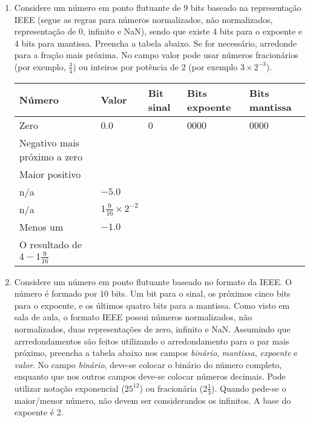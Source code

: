 \begin{enumerate}[resume]
    \item
    Considere um número em ponto flutuante de 9 bits 
    baseado na representação IEEE (segue as regras para números normalizados,
    não normalizados, representação de 0, infinito e NaN), sendo que 
    existe 4 bits para o expoente e 4 bits para mantissa.
    Preencha a tabela abaixo.
    Se for necessário, arredonde para a fração mais próxima.
    No campo valor pode usar números fracionários (por exemplo, $\frac{3}{4}$)
    ou inteiros por potência de 2 (por exemplo $3\times2^{-3}$).

    \begin{table}[H]
        \begin{tabular}{|l|l|l|l|l|}
            \hline
            \textbf{Número}  & 
            \textbf{Valor}    & 
            \textbf{Bit sinal}   &
            \textbf{Bits expoente}   &
            \textbf{Bits mantissa} \\\hline
            Zero & 0.0 & 0 & 0000 & 0000 \\\hline
            Negativo mais próximo a zero & & & & \\\hline
            Maior positivo & & & & \\\hline
            n/a & $-5.0$ & & & \\\hline
            n/a & $1\frac{9}{16}\times2^{-2}$ & & & \\\hline
            Menos um & $-1.0$ & & & \\\hline
            O resultado de $4-1\frac{9}{16}$ & & & & \\
            \hline
        \end{tabular}
    \end{table}

    \item
    Considere um número em ponto flutuante baseado no formato da IEEE.
    O número é formado por 10 bits. 
    Um bit para o sinal, 
    os próximos cinco bits para o expoente,
    e os últimos quatro bits para a mantissa.
    Como visto em sala de aula, o formato IEEE possui números normalizados,
    não normalizados, duas representações de zero, infinito e NaN.
    Assumindo que arrredondamentos são feitos utilizando
    o arredondamento para o par mais próximo,
    preencha a tabela abaixo nos campos 
    \textit{binário}, \textit{mantissa}, \textit{expoente} e \textit{valor}.
    No campo \textit{binário}, deve-se colocar o binário do número completo,
    enquanto que nos outros campos deve-se colocar números decimais.
    Pode utilizar notação exponencial ($25^{12}$) ou fracionária (2$\frac{1}{3}$).
    Quando pede-se o maior/menor número, não devem ser considerandos os infinitos.
    A base do expoente é 2.


\end{enumerate}
